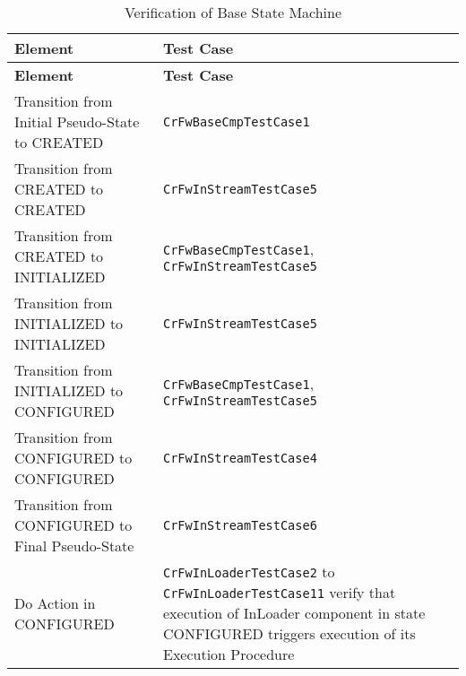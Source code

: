 \documentclass{pnp_article}
\begin{document}
\begin{longtable}{|>{\raggedright}p{8.0cm}|P{5.0cm}|}
\caption{Verification of Base State Machine}
\label{tab:verBaseSM}\\
\hline
{}
\textbf{Element} & \textbf{Test Case} \\
\hline
\endfirsthead
{}
\textbf{Element} & \textbf{Test Case} \\
\hline
\endhead
Transition from Initial Pseudo-State to CREATED  & \texttt{CrFwBaseCmpTestCase1}\\
\hline
Transition from CREATED to CREATED  & \texttt{CrFwInStreamTestCase5}\\
\hline
Transition from CREATED to INITIALIZED  & \texttt{CrFwBaseCmpTestCase1}, \texttt{CrFwInStreamTestCase5}\\
\hline
Transition from INITIALIZED to INITIALIZED  & \texttt{CrFwInStreamTestCase5}\\
\hline
Transition from INITIALIZED to CONFIGURED  & \texttt{CrFwBaseCmpTestCase1}, \texttt{CrFwInStreamTestCase5}\\
\hline
Transition from CONFIGURED to CONFIGURED  & \texttt{CrFwInStreamTestCase4}\\
\hline
Transition from CONFIGURED to Final Pseudo-State  & \texttt{CrFwInStreamTestCase6}\\
\hline
Do Action in CONFIGURED & \texttt{CrFwInLoaderTestCase2} to \texttt{CrFwInLoaderTestCase11} verify that execution of InLoader component in state CONFIGURED triggers execution of its Execution Procedure \\
\hline
\end{longtable}
\end{document}
